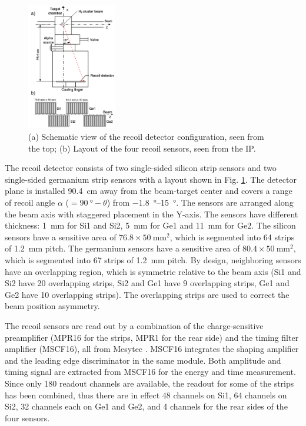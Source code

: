 \documentclass[number,5p]{elsarticle}
\begin{document}
\begin{figure}[htbp]
  \centering
  \includegraphics[width=0.35\textwidth]{./recoil_schematic.png}
  \caption{(a) Schematic view of the recoil detector configuration, seen from the
    top; (b) Layout of the four recoil sensors, seen from the IP.}
  \label{fig:recoil_schematic}
\end{figure}

The recoil detector consists of two single-sided silicon strip sensors and two
single-sided germanium strip sensors with a layout shown in Fig. \ref{fig:recoil_schematic}.
The detector plane is installed \SI{90.4}{\cm} away from the beam-target center
and covers a range of recoil angle $\alpha$ ($=\SI{90}{\degree}-\theta$) from \SIrange[range-units=repeat]{-1.8}{15}{\degree}.
The sensors are arranged along the beam axis with staggered placement in the Y-axis.
The sensors have different thickness: \SI{1}{\mm} for Si1
and Si2, \SI{5}{\mm} for Ge1 and \SI{11}{\mm} for Ge2.
The silicon sensors have a sensitive area of $76.8 \times \SI{50}{\mm\squared}$, which is
segmented into 64 strips of \SI{1.2}{\mm} pitch.
The germanium sensors have a sensitive area of \(80.4 \times \SI{50}{\mm\squared}\), which is segmented into 67 strips of \SI{1.2}{\mm} pitch.
By design, neighboring sensors have an overlapping region, which is symmetric
relative to the beam axis (Si1 and Si2 have 20 overlapping strips, Si2 and Ge1
have 9 overlapping strips, Ge1 and Ge2 have 10 overlapping strips).
The overlapping strips are used to correct the beam position asymmetry.

The recoil sensors are read out by a combination of the charge-sensitive preamplifier (MPR16 for the strips, MPR1 for the rear side) 
and the timing filter amplifier (MSCF16), all from Mesytec \cite{mesytec}. 
MSCF16 integrates the shaping amplifier and the leading edge discriminator in the same module.
Both amplitude and timing signal are extracted from MSCF16 for the energy and time measurement.
Since only 180 readout channels are available, the readout for some of the
strips has been combined, thus there are in effect 48 channels on Si1, 64
channels on Si2, 32 channels each on Ge1 and Ge2, and 4 channels for the rear sides
of the four sensors. 
\end{document}

